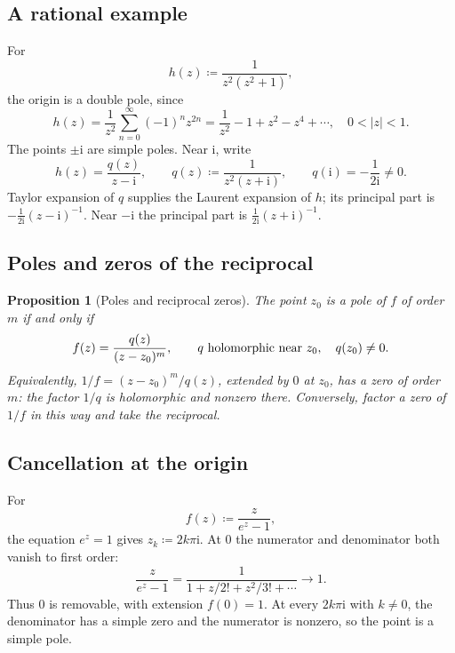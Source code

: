 \documentclass[11pt,a4paper]{article}
\theoremstyle{definition}
\theoremstyle{plain}
\newtheorem{proposition}{Proposition}
\begin{document}
\subsection{A rational example}
For
\begin{equation}\label{eq:23}
h(z)\coloneqq\frac1{z^2(z^2+1)},
\end{equation}
the origin is a double pole, since
\begin{equation}\label{eq:24}
h(z)=\frac1{z^2}\sum_{n=0}^{\infty}(-1)^nz^{2n}
      =\frac1{z^2}-1+z^2-z^4+\cdots,\quad0<|z|<1.
\end{equation}
The points $\pm \mathrm{i}$ are simple poles. Near $\mathrm{i}$, write
\begin{equation}\label{eq:25}
h(z)=\frac{q(z)}{z-\mathrm{i}},
 \qquad q(z)\coloneqq\frac1{z^2(z+\mathrm{i})},\qquad q(\mathrm{i})=-\frac1{2\mathrm{i}}\neq0.
\end{equation}
Taylor expansion of $q$ supplies the Laurent expansion of $h$; its
principal part is $-\frac1{2\mathrm{i}}(z-\mathrm{i})^{-1}$. Near $-\mathrm{i}$ the principal
part is $\frac1{2\mathrm{i}}(z+\mathrm{i})^{-1}$.

\subsection{Poles and zeros of the reciprocal}
\begin{proposition}[Poles and reciprocal zeros]
The point $z_0$ is a pole of $f$ of order $m$ if and only if
\begin{equation}\label{eq:26}
f(z)=\frac{q(z)}{(z-z_0)^m},
 \qquad q\ \hbox{holomorphic near }z_0,\quad q(z_0)\neq0.
\end{equation}
Equivalently, $1/f=(z-z_0)^m/q(z)$, extended by $0$ at $z_0$, has a
zero of order $m$: the factor $1/q$ is holomorphic and nonzero there.
Conversely, factor a zero of $1/f$ in this way and take the reciprocal.
\end{proposition}


\subsection{Cancellation at the origin}
For
\begin{equation}\label{eq:27}
f(z)\coloneqq\frac z{e^z-1},
\end{equation}
the equation $e^z=1$ gives $z_k\coloneqq 2k\pi \mathrm{i}$. At $0$ the numerator and
denominator both vanish to first order:
\begin{equation}\label{eq:28}
\frac z{e^z-1}=\frac1{1+z/2!+z^2/3!+\cdots}\longrightarrow1.
\end{equation}
Thus $0$ is removable, with extension $f(0)=1$. At every
$2k\pi \mathrm{i}$ with $k\neq0$, the denominator has a simple zero and the
numerator is nonzero, so the point is a simple pole.
\end{document}
